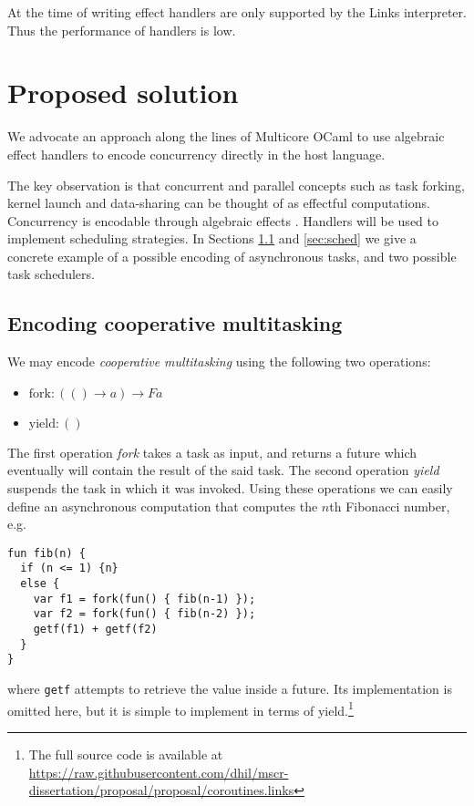 \documentclass[preprint,10pt,numbers]{sigplanconf}
\begin{document}
At the time of writing effect handlers are only supported by the Links interpreter. Thus the performance of handlers is low.

  \section{Proposed solution}\label{sec:proposedsolution}
We advocate an approach along the lines of Multicore OCaml to use algebraic effect handlers to encode concurrency directly in the host language. 

The key observation is that concurrent and parallel concepts such as task forking, kernel launch and data-sharing can be thought of as effectful computations. Concurrency is encodable through algebraic effects \cite{Bauer2015,Dolan2015}. Handlers will be used to implement scheduling strategies. In Sections \ref{sec:eff} and \ref{sec:sched} we give a concrete example of a possible encoding of asynchronous tasks, and two possible task schedulers.

\subsection{Encoding cooperative multitasking}\label{sec:eff}
We may encode \emph{cooperative multitasking} using the following two operations:
\begin{itemize}
  \item $\text{fork} : (() \to a) \to F a$
  \item $\text{yield} : ()$
\end{itemize}
The first operation \emph{fork} takes a task as input, and returns a future which eventually will contain the result of the said task. The second operation \emph{yield} suspends the task in which it was invoked. Using these operations we can easily define an asynchronous computation that computes the $n$th Fibonacci number, e.g. 
\begin{lstlisting}[style={links},caption={}]
fun fib(n) {
  if (n <= 1) {n}
  else {
    var f1 = fork(fun() { fib(n-1) });
    var f2 = fork(fun() { fib(n-2) });
    getf(f1) + getf(f2)
  }
}
\end{lstlisting}
where \texttt{getf} attempts to retrieve the value inside a future. Its implementation is omitted here, but it is simple to implement in terms of yield.\footnote{The full source code is available at \url{https://raw.githubusercontent.com/dhil/mscr-dissertation/proposal/proposal/coroutines.links}} 
\end{document}
